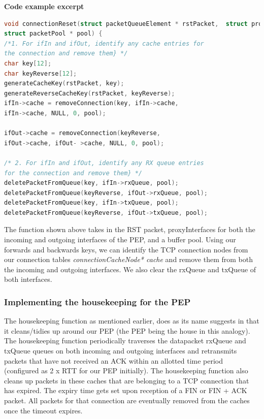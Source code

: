 \noindent \textbf{Code example excerpt}\\
\begin{lstlisting}[language=C]
void connectionReset(struct packetQueueElement * rstPacket,  struct proxyInterface * ifIn, struct proxyInterface * ifOut, 
struct packetPool * pool) { 
/*1. For ifIn and ifOut, identify any cache entries for 
the connection and remove them} */
char key[12];
char keyReverse[12];
generateCacheKey(rstPacket, key); 
generateReverseCacheKey(rstPacket, keyReverse);
ifIn->cache = removeConnection(key, ifIn->cache, 
ifIn->cache, NULL, 0, pool); 

ifOut->cache = removeConnection(keyReverse, 
ifOut->cache, ifOut- >cache, NULL, 0, pool); 
    
/* 2. For ifIn and ifOut, identify any RX queue entries 
for the connection and remove them} */
deletePacketFromQueue(key, ifIn->rxQueue, pool);
deletePacketFromQueue(keyReverse, ifOut->rxQueue, pool);
deletePacketFromQueue(key, ifIn->txQueue, pool);
deletePacketFromQueue(keyReverse, ifOut->txQueue, pool);
\end{lstlisting} 

The function shown above takes in the RST packet, proxyInterfaces for both the incoming and outgoing interfaces of the PEP, and a buffer pool. Using our forwards and backwards keys, we can identify the  TCP connection nodes from our connection tables \emph{connectionCacheNode* cache} and remove them from both the incoming and outgoing interfaces. We also clear the rxQueue and txQueue of both interfaces.

\subsubsection{Implementing the housekeeping for the PEP}
The housekeeping function as mentioned earlier, does as its name suggests in that it cleans/tidies up around our PEP (the PEP being the house in this analogy). The housekeeping function periodically traverses the datapacket rxQueue and txQueue queues on both incoming and outgoing interfaces and retransmits packets that have not received an ACK within an allotted time period (configured as 2 x RTT for our PEP initially). The housekeeping function also cleans up packets in these caches that are belonging to a TCP connection that has expired. The expiry time gets set upon reception of a FIN or FIN + ACK packet. All packets for that connection are eventually removed from the caches once the timeout expires.\\

